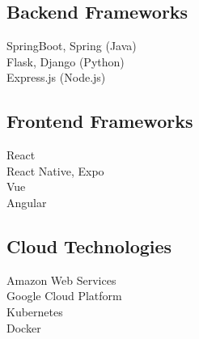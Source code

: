 \documentclass[letterpaper]{deedy-resume-openfont} %
\begin{document}
\begin{minipage}[t]{0.28\textwidth}
\sectionsep %

\subsection{Backend Frameworks}
\textbullet{} SpringBoot, Spring (Java)\\
\textbullet{} Flask, Django (Python)\\
\textbullet{} Express.js (Node.js)\\

\sectionsep %

\subsection{Frontend Frameworks}
\textbullet{} React\\
\textbullet{} React Native, Expo\\
\textbullet{} Vue\\
\textbullet{} Angular\\

\sectionsep %

\subsection{Cloud Technologies}
\textbullet{} Amazon Web Services\\
\textbullet{} Google Cloud Platform\\
\textbullet{} Kubernetes\\
\textbullet{} Docker\\

\sectionsep %


\end{minipage} %
\hfill
%
%
\end{document}
